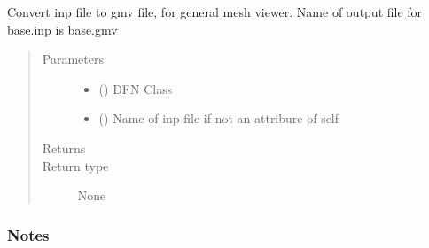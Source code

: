 \documentclass[letterpaper,10pt,english]{sphinxmanual}
\begin{document}

\begin{fulllineitems}
\label{\detokenize{pydfnworks:pydfnworks.dfnGen.mesh_dfn_helper.inp2gmv}}
Convert inp file to gmv file, for general mesh viewer. Name of output file for base.inp is base.gmv
\begin{quote}\begin{description}
\item[{Parameters}] \leavevmode\begin{itemize}
\item {} 
 () \textendash{} DFN Class

\item {} 
 () \textendash{} Name of inp file if not an attribure of self

\end{itemize}

\item[{Returns}] \leavevmode


\item[{Return type}] \leavevmode
None

\end{description}\end{quote}
\subsubsection*{Notes}

\end{fulllineitems}

\end{document}
